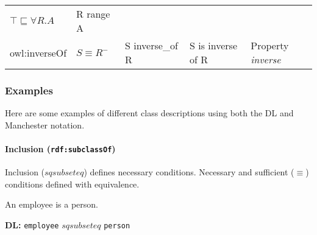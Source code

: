 \documentclass[a4paper,]{report}
\let\oldparagraph\paragraph
\renewcommand{\paragraph}[1]{\oldparagraph{#1}\mbox{}}
\begin{document}
\begin{longtable}[]{@{}lllll@{}}
\begin{minipage}[t]{0.16\columnwidth}
\(\top\sqsubseteq \forall R.A\)\strut
\end{minipage} & \begin{minipage}[t]{0.17\columnwidth}\raggedright
R range A\strut
\end{minipage} & \begin{minipage}[t]{0.20\columnwidth}\raggedright
\strut
\end{minipage} & \begin{minipage}[t]{0.14\columnwidth}\raggedright
\strut
\end{minipage}\tabularnewline
\begin{minipage}[t]{0.18\columnwidth}\raggedright
owl:inverseOf\strut
\end{minipage} & \begin{minipage}[t]{0.16\columnwidth}\raggedright
\(S\equiv R^-\)\strut
\end{minipage} & \begin{minipage}[t]{0.17\columnwidth}\raggedright
S inverse\_of R\strut
\end{minipage} & \begin{minipage}[t]{0.20\columnwidth}\raggedright
S is inverse of R\strut
\end{minipage} & \begin{minipage}[t]{0.14\columnwidth}\raggedright
Property \emph{inverse}\strut
\end{minipage}\tabularnewline
\bottomrule
\end{longtable}

\hypertarget{examples}{%
\subsubsection{Examples}\label{examples}}

Here are some examples of different class descriptions using both the DL
and Manchester notation.

\hypertarget{inclusion-rdfsubclassof}{%
\paragraph{\texorpdfstring{Inclusion
(\texttt{rdf:subclassOf})}{Inclusion (rdf:subclassOf)}}\label{inclusion-rdfsubclassof}}

Inclusion (\(sqsubseteq\)) defines necessary conditions. Necessary and
sufficient (\(\equiv\)) conditions defined with equivalence.

An employee is a person.

\textbf{DL:} \texttt{employee} \(sqsubseteq\) \texttt{person}
\end{document}
